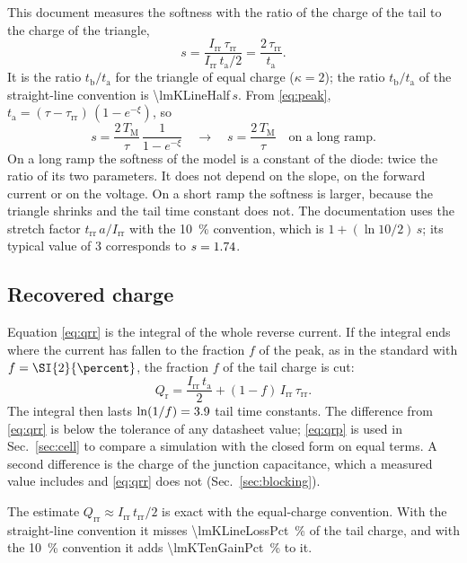\documentclass[10pt,a4paper]{scrartcl}
\newcommand{\Irr}{I_\mathrm{rr}}
\newcommand{\Qrr}{Q_\mathrm{rr}}
\newcommand{\trr}{t_\mathrm{rr}}
\newcommand{\ta}{t_\mathrm{a}}
\newcommand{\tb}{t_\mathrm{b}}
\newcommand{\taurr}{\tau_\mathrm{rr}}
\newcommand{\TM}{T_\mathrm{M}}
\begin{document}
This document measures the softness with the ratio of the charge of the tail to the charge of the triangle,
\begin{equation}
s = \frac{\Irr\,\taurr}{\Irr\,\ta/2} = \frac{2\,\taurr}{\ta} .
\label{eq:soft}
\end{equation}
It is the ratio $\tb/\ta$ for the triangle of equal charge ($\kappa = 2$); the ratio $\tb/\ta$ of the straight-line convention is \num{\lmKLineHalf}\,$s$. From \eqref{eq:peak}, $\ta = (\tau-\taurr)\,(1-e^{-\xi})$, so
\begin{equation}
s = \frac{2\,\TM}{\tau}\,\frac{1}{1-e^{-\xi}} \quad\longrightarrow\quad s = \frac{2\,\TM}{\tau} \quad \text{on a long ramp.}
\label{eq:softlong}
\end{equation}
On a long ramp the softness of the model is a constant of the diode: twice the ratio of its two parameters. It does not depend on the slope, on the forward current or on the voltage. On a short ramp the softness is larger, because the triangle shrinks and the tail time constant does not. The documentation \cite{mathworks} uses the stretch factor $\trr\,a/\Irr$ with the \SI{10}{\percent} convention, which is $1 + (\ln 10/2)\,s$; its typical value of 3 corresponds to $s = 1.74$.

\subsection{Recovered charge}
Equation \eqref{eq:qrr} is the integral of the whole reverse current. If the integral ends where the current has fallen to the fraction $f$ of the peak, as in the standard with $f = \SI{\lmPEndPct}{\percent}$, the fraction $f$ of the tail charge is cut:
\begin{equation}
Q_\mathrm{r} = \frac{\Irr\,\ta}{2} + (1-f)\,\Irr\,\taurr .
\label{eq:qrp}
\end{equation}
The integral then lasts $\ln(1/f) = 3.9$ tail time constants. The difference from \eqref{eq:qrr} is below the tolerance of any datasheet value; \eqref{eq:qrp} is used in Sec.~\ref{sec:cell} to compare a simulation with the closed form on equal terms. A second difference is the charge of the junction capacitance, which a measured value includes and \eqref{eq:qrr} does not (Sec.~\ref{sec:blocking}).

The estimate $\Qrr \approx \Irr\,\trr/2$ is exact with the equal-charge convention. With the straight-line convention it misses \SI{\lmKLineLossPct}{\percent} of the tail charge, and with the \SI{10}{\percent} convention it adds \SI{\lmKTenGainPct}{\percent} to it.
\end{document}

